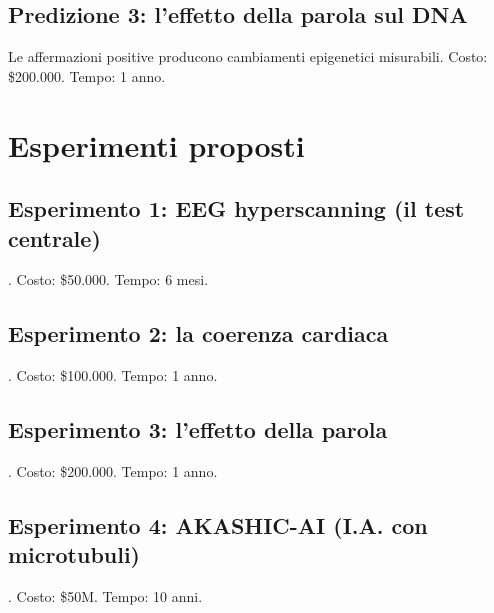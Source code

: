 \subsection{Predizione 3: l'effetto della parola sul DNA}
Le affermazioni positive producono cambiamenti epigenetici misurabili. Costo: \$200.000. Tempo: 1 anno.

\section{Esperimenti proposti}
\subsection{Esperimento 1: EEG hyperscanning (il test centrale)}. Costo: \$50.000. Tempo: 6 mesi.
\subsection{Esperimento 2: la coerenza cardiaca}. Costo: \$100.000. Tempo: 1 anno.
\subsection{Esperimento 3: l'effetto della parola}. Costo: \$200.000. Tempo: 1 anno.
\subsection{Esperimento 4: AKASHIC-AI (I.A. con microtubuli)}. Costo: \$50M. Tempo: 10 anni.

